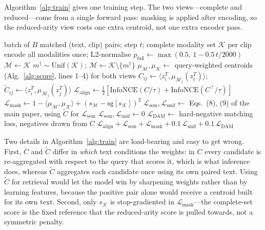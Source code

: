\documentclass[10pt,twocolumn,letterpaper]{article}
\newcommand{\ours}{SCALAR}
\begin{document}
Algorithm~\ref{alg:train} gives one training step. The two views---complete and
reduced---come from a single forward pass: masking is applied after encoding, so
the reduced-arity view costs one extra centroid, not one extra encoder pass.

\begin{algorithm}[t]
\caption{One \ours{} training step}
\label{alg:train}
\begin{algorithmic}[1]
\Require batch of $B$ matched (text, clip) pairs; step $t$; complete modality
         set $\mathcal{K}$ per clip
\State encode all modalities once; L2-normalise
\State $p_{\mathrm{full}} \gets \max(0.5,\, 1 - 0.5\,t/2000)$
     \State $\mathcal{M} \gets \mathcal{K}$
  \Else
     \State $m^\dagger \sim \mathrm{Unif}(\mathcal{K})$;\;
            $\mathcal{M} \gets \mathcal{K}\setminus\{m^\dagger\}$
  \EndIf
\EndFor
\State $\mu_{\mathcal{M}}, \mu_{\mathcal{K}} \gets$ query-weighted centroids
       (Alg.~\ref{alg:score}, lines 1--4) for both views
\State $C_{ij} \gets \langle z^T_i, \mu_{\mathcal{M}_j}(z^T_i)\rangle$;\quad
       $\tilde{C}_{ij} \gets \langle z^T_i, \mu_{\mathcal{M}_j}(z^T_j)\rangle$
\State $\mathcal{L}_{\mathrm{align}} \gets
        \tfrac12[\mathrm{InfoNCE}(C/\tau) + \mathrm{InfoNCE}(C^\top\!/\tau)]$
\State $\mathcal{L}_{\mathrm{mask}} \gets
        1-\langle\mu_{\mathcal{M}},\mu_{\mathcal{K}}\rangle
        + (s_{\mathcal{M}}-\mathrm{sg}[s_{\mathcal{K}}])^2$
 
  \State $\mathcal{L}_{\mathrm{sem}}, \mathcal{L}_{\mathrm{unif}} \gets$
         Eqs.~(8), (9) of the main paper, using $\tilde{C}$ for
         $\mathcal{L}_{\mathrm{sem}}$
\Else
  \State $\mathcal{L}_{\mathrm{sem}}, \mathcal{L}_{\mathrm{unif}} \gets 0$
\EndIf
\State $\mathcal{L}_{\mathrm{DAM}} \gets$ hard-negative matching loss, negatives
       drawn from $C$
\State \Return $\mathcal{L}_{\mathrm{align}} + \mathcal{L}_{\mathrm{sem}}
        + \mathcal{L}_{\mathrm{mask}} + 0.1\,\mathcal{L}_{\mathrm{unif}}
        + 0.1\,\mathcal{L}_{\mathrm{DAM}}$
\end{algorithmic}
\end{algorithm}

Two details in Algorithm~\ref{alg:train} are load-bearing and easy to get wrong.
First, $C$ and $\tilde{C}$ differ in \emph{which} text conditions the weights:
in $C$ every candidate is re-aggregated with respect to the query that scores
it, which is what inference does, whereas $\tilde{C}$ aggregates each candidate
once using its own paired text. Using $\tilde{C}$ for retrieval would let the
model win by sharpening weights rather than by learning features, because the
positive pair alone would receive a centroid built for its own text. Second,
only $s_{\mathcal{K}}$ is stop-gradiented in
$\mathcal{L}_{\mathrm{mask}}$---the complete-set score is the fixed reference
that the reduced-arity score is pulled towards, not a symmetric penalty.
\end{document}
